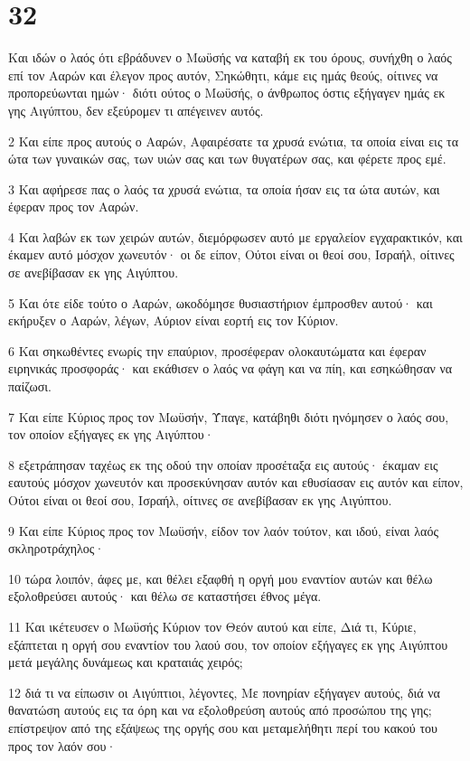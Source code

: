 \chapter{32}

\par Και ιδών ο λαός ότι εβράδυνεν ο Μωϋσής να καταβή εκ του όρους, συνήχθη ο λαός επί τον Ααρών και έλεγον προς αυτόν, Σηκώθητι, κάμε εις ημάς θεούς, οίτινες να προπορεύωνται ημών· διότι ούτος ο Μωϋσής, ο άνθρωπος όστις εξήγαγεν ημάς εκ γης Αιγύπτου, δεν εξεύρομεν τι απέγεινεν αυτός.
\par 2 Και είπε προς αυτούς ο Ααρών, Αφαιρέσατε τα χρυσά ενώτια, τα οποία είναι εις τα ώτα των γυναικών σας, των υιών σας και των θυγατέρων σας, και φέρετε προς εμέ.
\par 3 Και αφήρεσε πας ο λαός τα χρυσά ενώτια, τα οποία ήσαν εις τα ώτα αυτών, και έφεραν προς τον Ααρών.
\par 4 Και λαβών εκ των χειρών αυτών, διεμόρφωσεν αυτό με εργαλείον εγχαρακτικόν, και έκαμεν αυτό μόσχον χωνευτόν· οι δε είπον, Ούτοι είναι οι θεοί σου, Ισραήλ, οίτινες σε ανεβίβασαν εκ γης Αιγύπτου.
\par 5 Και ότε είδε τούτο ο Ααρών, ωκοδόμησε θυσιαστήριον έμπροσθεν αυτού· και εκήρυξεν ο Ααρών, λέγων, Αύριον είναι εορτή εις τον Κύριον.
\par 6 Και σηκωθέντες ενωρίς την επαύριον, προσέφεραν ολοκαυτώματα και έφεραν ειρηνικάς προσφοράς· και εκάθισεν ο λαός να φάγη και να πίη, και εσηκώθησαν να παίζωσι.
\par 7 Και είπε Κύριος προς τον Μωϋσήν, Ύπαγε, κατάβηθι διότι ηνόμησεν ο λαός σου, τον οποίον εξήγαγες εκ γης Αιγύπτου·
\par 8 εξετράπησαν ταχέως εκ της οδού την οποίαν προσέταξα εις αυτούς· έκαμαν εις εαυτούς μόσχον χωνευτόν και προσεκύνησαν αυτόν και εθυσίασαν εις αυτόν και είπον, Ούτοι είναι οι θεοί σου, Ισραήλ, οίτινες σε ανεβίβασαν εκ γης Αιγύπτου.
\par 9 Και είπε Κύριος προς τον Μωϋσήν, είδον τον λαόν τούτον, και ιδού, είναι λαός σκληροτράχηλος·
\par 10 τώρα λοιπόν, άφες με, και θέλει εξαφθή η οργή μου εναντίον αυτών και θέλω εξολοθρεύσει αυτούς· και θέλω σε καταστήσει έθνος μέγα.
\par 11 Και ικέτευσεν ο Μωϋσής Κύριον τον Θεόν αυτού και είπε, Διά τι, Κύριε, εξάπτεται η οργή σου εναντίον του λαού σου, τον οποίον εξήγαγες εκ γης Αιγύπτου μετά μεγάλης δυνάμεως και κραταιάς χειρός;
\par 12 διά τι να είπωσιν οι Αιγύπτιοι, λέγοντες, Με πονηρίαν εξήγαγεν αυτούς, διά να θανατώση αυτούς εις τα όρη και να εξολοθρεύση αυτούς από προσώπου της γης; επίστρεψον από της εξάψεως της οργής σου και μεταμελήθητι περί του κακού του προς τον λαόν σου·
